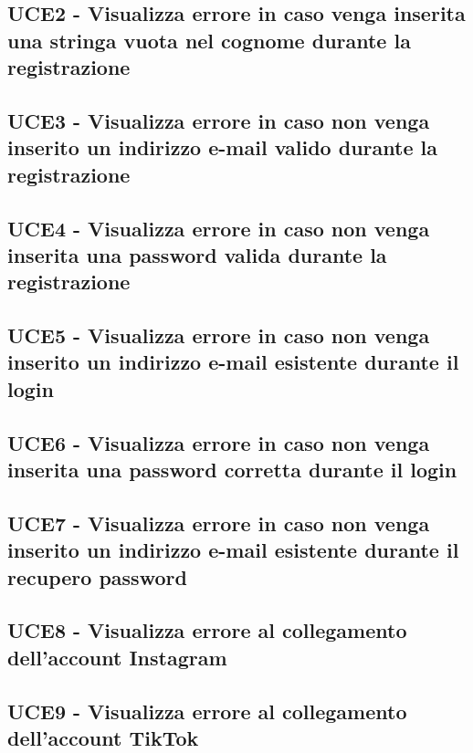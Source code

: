 \documentclass[a4paper]{article}
\begin{document}
	\subsection{UCE2 - Visualizza errore in caso venga inserita una stringa vuota nel cognome durante la registrazione}
		
	
	\subsection{UCE3 - Visualizza errore in caso non venga inserito un indirizzo e-mail valido durante la registrazione}
		
	
	\subsection{UCE4 - Visualizza errore in caso non venga inserita una password valida durante la registrazione}
	
	
	\subsection{UCE5 - Visualizza errore in caso non venga inserito un indirizzo e-mail esistente durante il login}
	

	\subsection{UCE6 - Visualizza errore in caso non venga inserita una password corretta durante il login}
		

	\subsection{UCE7 - Visualizza errore in caso non venga inserito un indirizzo e-mail esistente durante il recupero password}
	
	
	\subsection{UCE8 - Visualizza errore al collegamento dell'account Instagram}
		

	\subsection{UCE9 - Visualizza errore al collegamento dell'account TikTok}
				
	
\end{document}
